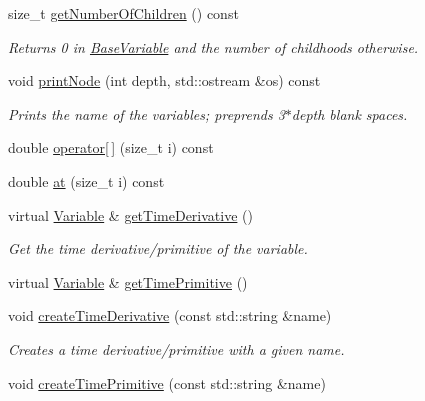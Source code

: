 \begin{DoxyCompactItemize}
size\+\_\+t \hyperlink{classocra_1_1Variable_aabb9b5602a269bb9a2baf18184b29292}{get\+Number\+Of\+Children} () const
\begin{DoxyCompactList}\small\item\em Returns 0 in \hyperlink{classocra_1_1BaseVariable}{Base\+Variable} and the number of childhoods otherwise. \end{DoxyCompactList}\item 
void \hyperlink{classocra_1_1Variable_a0c983344cab7d6ca593cc21e47780b19}{print\+Node} (int depth, std\+::ostream \&os) const
\begin{DoxyCompactList}\small\item\em Prints the name of the variables; preprends 3$\ast$depth blank spaces. \end{DoxyCompactList}\end{DoxyCompactItemize}
{\bf }\par
\begin{DoxyCompactItemize}
\item 
double \hyperlink{classocra_1_1Variable_a2326e0b8b2885dd44b654c55163a712c}{operator\mbox{[}$\,$\mbox{]}} (size\+\_\+t i) const
\item 
double \hyperlink{classocra_1_1Variable_aa63236c657ccd8a0f347f257be5ba8fc}{at} (size\+\_\+t i) const
\end{DoxyCompactItemize}

{\bf }\par
\begin{DoxyCompactItemize}
\item 
virtual \hyperlink{classocra_1_1Variable}{Variable} \& \hyperlink{classocra_1_1Variable_a06ee384364d5c6bd1ea4bc4b38d6268c}{get\+Time\+Derivative} ()
\begin{DoxyCompactList}\small\item\em Get the time derivative/primitive of the variable. \end{DoxyCompactList}\item 
virtual \hyperlink{classocra_1_1Variable}{Variable} \& \hyperlink{classocra_1_1Variable_aca32d63e60dc79de340b2f122dad0dc5}{get\+Time\+Primitive} ()
\end{DoxyCompactItemize}

{\bf }\par
\begin{DoxyCompactItemize}
\item 
void \hyperlink{classocra_1_1Variable_a7568587518043287ad671e53c0c04252}{create\+Time\+Derivative} (const std\+::string \&name)
\begin{DoxyCompactList}\small\item\em Creates a time derivative/primitive with a given name. \end{DoxyCompactList}\item 
void \hyperlink{classocra_1_1Variable_ac21275c0369ff7412d44bbb8ca5b9c7b}{create\+Time\+Primitive} (const std\+::string \&name)
\end{DoxyCompactItemize}

